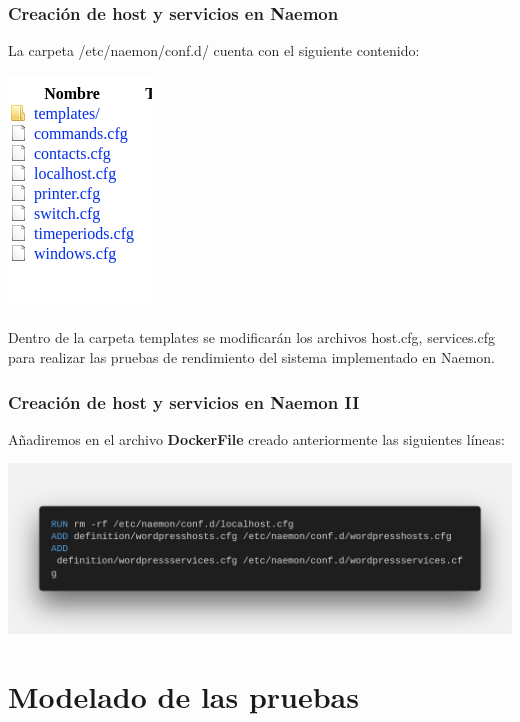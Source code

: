 \documentclass{beamer}
\theoremstyle{plain}
\theoremstyle{definition}
\theoremstyle{plain}
\theoremstyle{definition}
\theoremstyle{remark}
\theoremstyle{definition}
\begin{document}
\begin{frame}
	\frametitle{Creación de host y servicios en Naemon}
	La carpeta /etc/naemon/conf.d/ cuenta con el siguiente contenido:
		
	\begin{center} 	
			\includegraphics[scale=0.3]{imagenes/confd.png}
	\end{center}	
	Dentro de la carpeta templates se modificarán los archivos host.cfg, services.cfg para realizar las pruebas de rendimiento del sistema implementado en Naemon.
	
\end{frame}
\begin{frame}
	\frametitle{Creación de host y servicios en Naemon II}
	Añadiremos en el archivo \textbf{DockerFile} creado anteriormente las siguientes líneas:

	\centering
	\includegraphics[scale=0.15]{imagenes/dockerfuileHOST.png}	
\end{frame}

\section{Modelado de las pruebas} %
\end{document}
